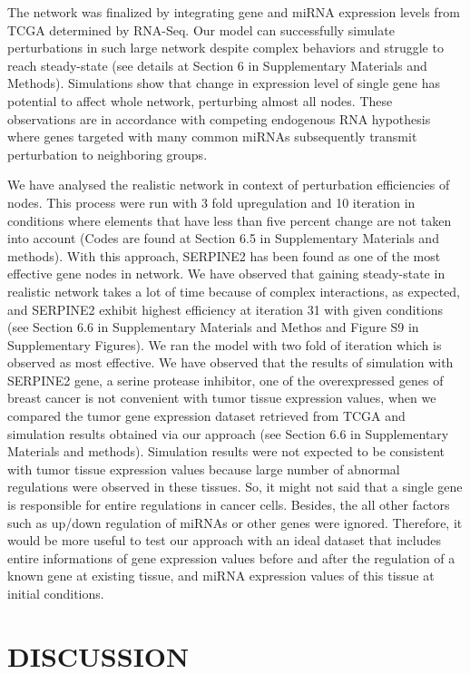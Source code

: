 \documentclass[a4,center,fleqn]{NAR}
\begin{document}
The network was finalized by integrating gene and miRNA expression
levels from TCGA determined by RNA-Seq. Our model can successfully
simulate perturbations in such large network despite complex behaviors
and struggle to reach steady-state (see details at Section 6 in
Supplementary Materials and Methods). Simulations show that change in
expression level of single gene has potential to affect whole network,
perturbing almost all nodes. These observations are in accordance with
competing endogenous RNA hypothesis where genes targeted with many
common miRNAs subsequently transmit perturbation to neighboring groups.

We have analysed the realistic network in context of perturbation
efficiencies of nodes. This process were run with 3 fold upregulation
and 10 iteration in conditions where elements that have less than five
percent change are not taken into account (Codes are found at Section
6.5 in Supplementary Materials and methods). With this approach,
SERPINE2 has been found as one of the most effective gene nodes in
network. We have observed that gaining steady-state in realistic network
takes a lot of time because of complex interactions, as expected, and
SERPINE2 exhibit highest efficiency at iteration 31 with given
conditions (see Section 6.6 in Supplementary Materials and Methos and
Figure S9 in Supplementary Figures). We ran the model with two fold of
iteration which is observed as most effective. We have observed that the
results of simulation with SERPINE2 gene, a serine protease inhibitor,
one of the overexpressed genes of breast cancer
\citep{yang2018expression, candia2006protease} is not convenient with
tumor tissue expression values, when we compared the tumor gene
expression dataset retrieved from TCGA and simulation results obtained
via our approach (see Section 6.6 in Supplementary Materials and
methods). Simulation results were not expected to be consistent with
tumor tissue expression values because large number of abnormal
regulations were observed in these tissues. So, it might not said that a
single gene is responsible for entire regulations in cancer cells.
Besides, the all other factors such as up/down regulation of miRNAs or
other genes were ignored. Therefore, it would be more useful to test our
approach with an ideal dataset that includes entire informations of gene
expression values before and after the regulation of a known gene at
existing tissue, and miRNA expression values of this tissue at initial
conditions.

\section{DISCUSSION}
\end{document}
